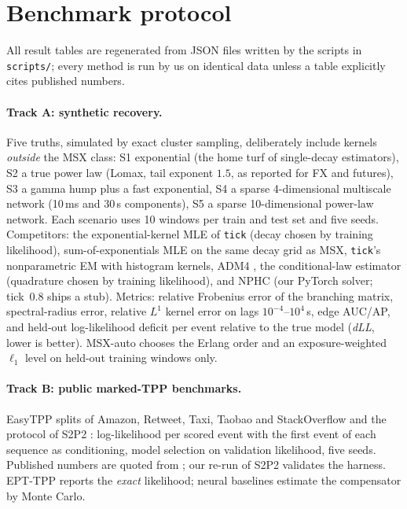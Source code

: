 \section{Benchmark protocol}\label{sec:bench}

All result tables are regenerated from JSON files written by the scripts in
\texttt{scripts/}; every method is run by us on identical data unless a table
explicitly cites published numbers.

\paragraph{Track A: synthetic recovery.}
Five truths, simulated by exact cluster sampling, deliberately include kernels
\emph{outside} the MSX class: S1 exponential (the home turf of single-decay estimators),
S2 a true power law (Lomax, tail exponent $1.5$, as reported for FX and futures), S3 a
gamma hump plus a fast exponential, S4 a sparse 4-dimensional multiscale network
(10\,ms and 30\,s components), S5 a sparse 10-dimensional power-law network. Each
scenario uses 10 windows per train and test set and five seeds. Competitors:
the exponential-kernel MLE of \texttt{tick} \citep{bacry2018tick} (decay chosen by training
likelihood), sum-of-exponentials MLE on the same decay grid as MSX, \texttt{tick}'s
nonparametric EM with histogram kernels, ADM4 \citep{zhou2013learning}, the conditional-law estimator
\citep{bacry2016estimation} (quadrature chosen by training likelihood), and NPHC
\citep{achab2017uncovering} (our PyTorch solver; tick~0.8 ships a stub). Metrics:
relative Frobenius error of the branching matrix, spectral-radius error, relative $L^1$
kernel error on lags $10^{-4}$--$10^4$\,s, edge AUC/AP, and held-out log-likelihood
deficit per event relative to the true model (\emph{dLL}, lower is better).
MSX-auto chooses the Erlang order and an exposure-weighted $\ell_1$ level on held-out
training windows only.

\paragraph{Track B: public marked-TPP benchmarks.}
EasyTPP splits of Amazon, Retweet, Taxi, Taobao and StackOverflow and the protocol of
S2P2 \citep{chang2025deep}: log-likelihood per scored event with the first event of each
sequence as conditioning, model selection on validation likelihood, five seeds.
Published numbers are quoted from \citet{chang2025deep}; our re-run of S2P2 validates the
harness. EPT-TPP reports the \emph{exact} likelihood; neural baselines estimate the
compensator by Monte Carlo.

